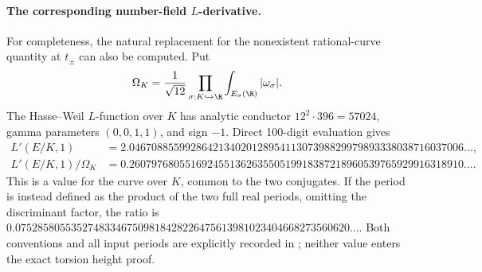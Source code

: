 \paragraph{The corresponding number-field $L$-derivative.}
For completeness, the natural replacement for the nonexistent
rational-curve quantity at $t_\pm$ can also be computed. Put
\[
 \Omega_K=\frac1{\sqrt{12}}
  \prod_{\sigma:K\hookrightarrow\R}
       \int_{E_\sigma(\R)}|\omega_\sigma|.
\]
The Hasse--Weil $L$-function over $K$ has analytic conductor
$12^2\cdot396=57024$, gamma parameters $(0,0,1,1)$, and sign
$-1$. Direct 100-digit evaluation gives
\begin{align*}
 L'(E/K,1)&=2.046708855992864213402012895411307398829979893338038716037006\ldots,\\
 L'(E/K,1)/\Omega_K
 &=0.260797680551692455136263550519918387218960539765929916318910\ldots.
\end{align*}
This is a value for the curve over $K$, common to the two
conjugates. If the period is instead defined as the product of
the two full real periods, omitting the discriminant factor,
the ratio is
$0.075285805535274833467509818428226475613981023404668273560620\ldots$.
Both conventions and all input periods are explicitly recorded
in ; neither value enters
the exact torsion height proof.
